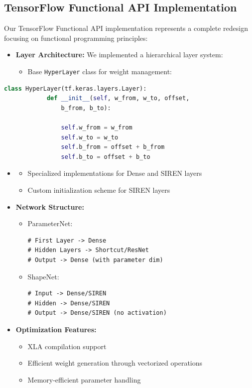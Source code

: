 \documentclass[10pt,journal,compsoc]{IEEEtran}
\begin{document}
\subsection{TensorFlow Functional API Implementation}
Our TensorFlow Functional API implementation represents a complete redesign focusing on functional programming principles:
\begin{itemize}
    \item \textbf{Layer Architecture:} We implemented a hierarchical layer system:
    \begin{itemize}
        \item Base \texttt{HyperLayer} class for weight management:
    \end{itemize}
\end{itemize}
        \begin{lstlisting}[language=Python, gobble=8]
        class HyperLayer(tf.keras.layers.Layer):
            def __init__(self, w_from, w_to, offset,
                b_from, b_to):

                self.w_from = w_from
                self.w_to = w_to
                self.b_from = offset + b_from
                self.b_to = offset + b_to
        \end{lstlisting}
\begin{itemize}
    \item[]
    \begin{itemize}
        \item Specialized implementations for Dense and SIREN layers
        \item Custom initialization scheme for SIREN layers
    \end{itemize}

    \item \textbf{Network Structure:}
    \begin{itemize}
        \item ParameterNet:
        \begin{verbatim}
# First Layer -> Dense
# Hidden Layers -> Shortcut/ResNet
# Output -> Dense (with parameter dim)
        \end{verbatim}
        \item ShapeNet:
        \begin{verbatim}
# Input -> Dense/SIREN
# Hidden -> Dense/SIREN
# Output -> Dense/SIREN (no activation)
        \end{verbatim}
    \end{itemize}
    
    \item \textbf{Optimization Features:}
    \begin{itemize}
        \item XLA compilation support
        \item Efficient weight generation through vectorized operations
        \item Memory-efficient parameter handling
    \end{itemize}
\end{itemize}
\end{document}
